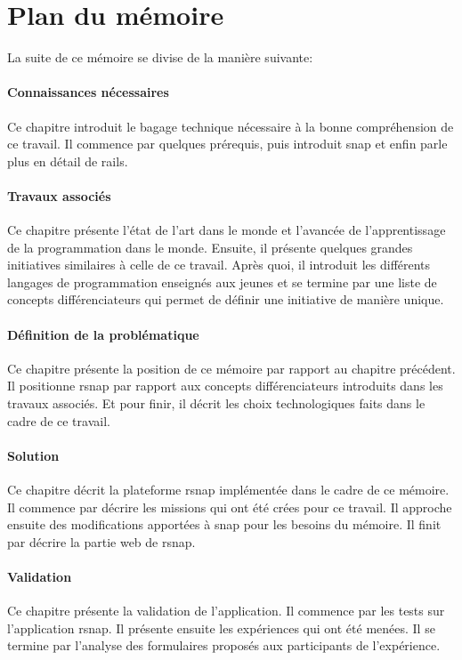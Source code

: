 \section{Plan du mémoire}
La suite de ce mémoire se divise de la manière suivante:

\paragraph{Connaissances nécessaires}
Ce chapitre introduit le bagage technique nécessaire à la bonne compréhension de ce travail. Il commence par quelques prérequis, puis introduit \gls{snap} et enfin parle plus en détail de \gls{rails}.

\paragraph{Travaux associés}
Ce chapitre présente l'état de l'art dans le monde et l'avancée de l'apprentissage de la programmation dans le monde. Ensuite, il présente quelques grandes initiatives similaires à celle de ce travail. Après quoi, il introduit les différents langages de programmation enseignés aux jeunes et se termine par une liste de concepts différenciateurs qui permet de définir une initiative de manière unique.

\paragraph{Définition de la problématique}
Ce chapitre présente la position de ce mémoire par rapport au chapitre précédent. Il positionne \gls{rsnap} par rapport aux concepts différenciateurs introduits dans les travaux associés. Et pour finir, il décrit les choix technologiques faits dans le cadre de ce travail.

\paragraph{Solution}
Ce chapitre décrit la plateforme \gls{rsnap} implémentée dans le cadre de ce mémoire.
Il commence par décrire les \glspl{mission} qui ont été crées pour ce travail. Il approche ensuite des modifications apportées à \gls{snap} pour les besoins du mémoire. Il finit par décrire la partie web de \gls{rsnap}.

\paragraph{Validation}
Ce chapitre présente la validation de l'application. Il commence par les tests sur l'application \gls{rsnap}. Il présente ensuite les expériences qui ont été menées. Il se termine par l'analyse des formulaires proposés aux participants de l'expérience.

